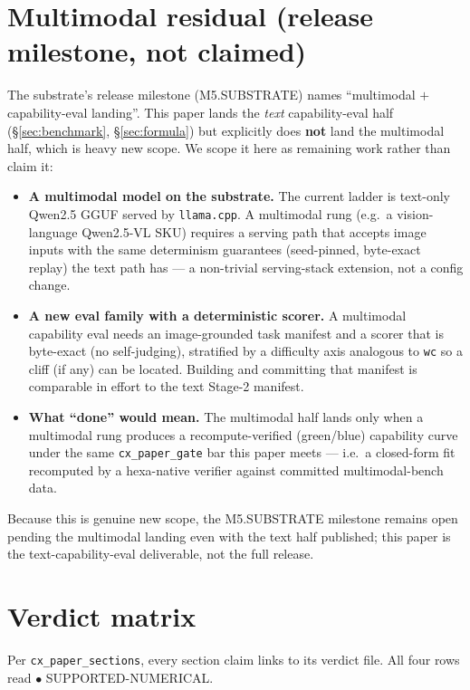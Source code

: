 \documentclass[11pt,a4paper]{article}
\begin{document}
\section{Multimodal residual (release milestone, not claimed)}
\label{sec:multimodal}
The substrate's release milestone (M5.SUBSTRATE) names ``multimodal
\(+\) capability-eval landing''. This paper lands the \emph{text}
capability-eval half (§\ref{sec:benchmark}, §\ref{sec:formula}) but
explicitly does \textbf{not} land the multimodal half, which is heavy new
scope. We scope it here as remaining work rather than claim it:
\begin{itemize}
  \item \textbf{A multimodal model on the substrate.} The current ladder is
    text-only Qwen2.5 GGUF served by \texttt{llama.cpp}. A multimodal rung
    (e.g.\ a vision-language Qwen2.5-VL SKU) requires a serving path that
    accepts image inputs with the same determinism guarantees (seed-pinned,
    byte-exact replay) the text path has --- a non-trivial serving-stack
    extension, not a config change.
  \item \textbf{A new eval family with a deterministic scorer.} A multimodal
    capability eval needs an image-grounded task manifest and a scorer that
    is byte-exact (no self-judging), stratified by a difficulty axis
    analogous to \texttt{wc} so a cliff (if any) can be located. Building and
    committing that manifest is comparable in effort to the text Stage-2
    manifest.
  \item \textbf{What ``done'' would mean.} The multimodal half lands only
    when a multimodal rung produces a recompute-verified (green/blue)
    capability curve under the same \texttt{cx\_paper\_gate} bar this paper
    meets --- i.e.\ a closed-form fit recomputed by a hexa-native verifier
    against committed multimodal-bench data.
\end{itemize}
Because this is genuine new scope, the M5.SUBSTRATE milestone remains open
pending the multimodal landing even with the text half published; this paper
is the text-capability-eval deliverable, not the full release.

\section{Verdict matrix}
\label{sec:verdict-matrix}
Per \texttt{cx\_paper\_sections}, every section claim links to its verdict
file. All four rows read \(\bullet\) SUPPORTED-NUMERICAL.
\end{document}
